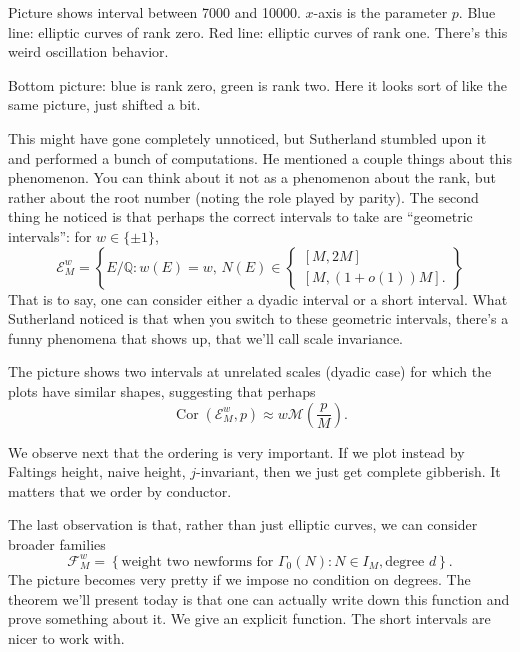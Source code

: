 \documentclass[reqno]{amsart} 
\begin{document}
Picture shows interval between 7000 and 10000.  $x$-axis is the parameter $p$.  Blue line: elliptic curves of rank zero.  Red line: elliptic curves of rank one.  There's this weird oscillation behavior.

Bottom picture: blue is rank zero, green is rank two.  Here it looks sort of like the same picture, just shifted a bit.

This might have gone completely unnoticed, but Sutherland stumbled upon it and performed a bunch of computations.  He mentioned a couple things about this phenomenon.  You can think about it not as a phenomenon about the rank, but rather about the root number (noting the role played by parity).  The second thing he noticed is that perhaps the correct intervals to take are ``geometric intervals'': for $w \in \{\pm 1\}$,
\begin{equation*}
  \mathcal{E}_M^w
  = \left\{ E / \mathbb{Q} : w(E) = w, \,
    N(E) \in
    \begin{cases}
      [M,2 M]  \\
      [M, (1 + o(1)) M].
    \end{cases}
  \right\}
\end{equation*}
That is to say, one can consider either a dyadic interval or a short interval.  What Sutherland noticed is that when you switch to these geometric intervals, there's a funny phenomena that shows up, that we'll call scale invariance.

The picture shows two intervals at unrelated scales (dyadic case) for which the plots have similar shapes, suggesting that perhaps
\begin{equation*}
  \operatorname{Cor} (\mathcal{E}_M^w , p )
  \approx w \mathcal{M} \left( \frac{p}{M} \right).
\end{equation*}

We observe next that the ordering is very important.  If we plot instead by Faltings height, naive height, $j$-invariant, then we just get complete gibberish.  It matters that we order by conductor.

The last observation is that, rather than just elliptic curves, we can consider broader families
\begin{equation*}
  \mathcal{F}_M^w = \left\{ \text{weight two newforms for } \Gamma_0 (N) : N \in I_M,
    \text{degree $d$}
  \right\}.
\end{equation*}
The picture becomes very pretty if we impose no condition on degrees.  The theorem we'll present today is that one can actually write down this function and prove something about it.  We give an explicit function.  The short intervals are nicer to work with.
\end{document}
